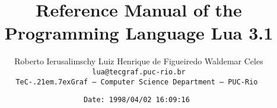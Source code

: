 

\newcommand{\See}[1]{Section~\ref{#1}}
\newcommand{\see}[1]{(see \See{#1})}
\newcommand{\M}[1]{\emph{#1}}
\newcommand{\T}[1]{{\tt #1}}
\newcommand{\Math}[1]{$#1$}
\newcommand{\nil}{{\bf nil}}
\newcommand{\Line}{\rule{\linewidth}{.5mm}}
\def\tecgraf{{\sf TeC\kern-.21em\lower.7ex\hbox{Graf}}}

\newcommand{\Index}[1]{#1\index{#1}}
\newcommand{\IndexVerb}[1]{\T{#1}\index{#1}}
\newcommand{\Def}[1]{\emph{#1}\index{#1}}
\newcommand{\Deffunc}[1]{\index{#1}}

\newcommand{\ff}{$\bullet$\ }

\newcommand{\Version}{3.1}

\makeindex



\title{Reference Manual of the Programming Language Lua \Version}

\author{%
Roberto Ierusalimschy\quad
Luiz Henrique de Figueiredo\quad
Waldemar Celes
\vspace{1.0ex}\\
\smallskip
\small\tt lua@tecgraf.puc-rio.br
\vspace{2.0ex}\\
\tecgraf\ --- Computer Science Department --- PUC-Rio
}

\date{\small \verb$Date: 1998/04/02 16:09:16 $}

\maketitle

\thispagestyle{empty}
\pagestyle{empty}

